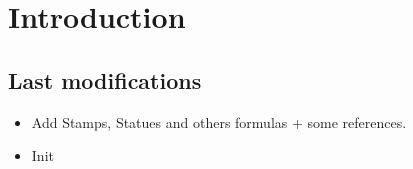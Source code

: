 \chapter{Introduction}
    \section{Last modifications}
        \begin{itemize}
            \item Add Stamps, Statues and others formulas + some references. 
            \item Init
        \end{itemize}